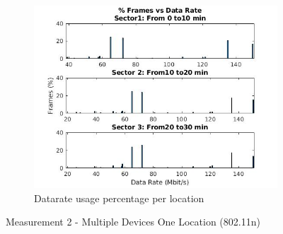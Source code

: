 \documentclass[12]{article}
\begin{document}
\begin{figure}[!htb]
\hspace*{-1.2cm}
\begin{subfigure}{.5\textwidth}
  \includegraphics[width=\linewidth]{"measurement 2/n_test33"}
  \caption{Datarate usage percentage per location}
  \label{fig:n_meas2_sub3}
\end{subfigure}
\caption{Measurement 2 - Multiple Devices One Location (802.11n)}
\label{fig:n_meas2}
\end{figure}
\end{document}
